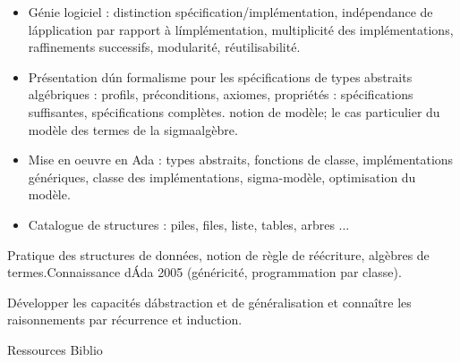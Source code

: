 {
\begin{itemize} 
\item Génie logiciel :
distinction spécification/implémentation,
indépendance de l\'application par rapport à l\'implémentation,
multiplicité des implémentations, raffinements successifs,
modularité, réutilisabilité.
\item Présentation d\'un formalisme pour les spécifications de types abstraits
algébriques :
profils, préconditions, axiomes,
propriétés : spécifications suffisantes, spécifications complètes.
notion de modèle; le cas particulier du modèle des termes de la sigmaalgèbre.
\item Mise en oeuvre en Ada :
types abstraits, fonctions de classe,
implémentations génériques, classe des implémentations,
sigma-modèle, optimisation du modèle.
\item Catalogue de structures : piles, files, liste, tables, arbres ...
\end{itemize} 
} 
{Pratique des structures de données, notion de règle de réécriture, algèbres
de termes.Connaissance d\'Ada 2005 (généricité, programmation par classe).} 
{\begin{itemize} 
  \ObjItem Développer les capacités d\'abstraction et de généralisation et connaître les
raisonnements par récurrence et induction.
\end{itemize} 
} 
{Ressources} 
{Biblio} 
 
\vfill

